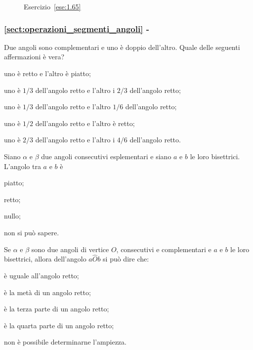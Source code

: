 \begin{figure}[htb]
 \centering
 \caption{Esercizio~\ref{ese:1.65}}\label{fig:ese1.65}
\end{figure}

\begingroup
\hypersetup{linkcolor=black}
\subsubsection*{\ref{sect:operazioni_segmenti_angoli} - }
\endgroup

\begin{esercizio}
\label{ese:1.66}
Due angoli sono complementari e uno è doppio dell'altro. Quale delle seguenti affermazioni è vera?
\begin{enumeratea}
\item uno è retto e l'altro è piatto;
\item uno è $1/3$ dell'angolo retto e l'altro i $2/3$ dell'angolo retto;
\item uno è $1/3$ dell'angolo retto e l'altro $1/6$ dell'angolo retto;
\item uno è $1/2$ dell'angolo retto e l'altro è retto;
\item uno è $2/3$ dell'angolo retto e l'altro i $4/6$ dell'angolo retto.
\end{enumeratea}
\end{esercizio}

\begin{esercizio}
\label{ese:1.67}
Siano $\alpha$ e $\beta$ due angoli consecutivi esplementari e siano $a$ e $b$ le loro bisettrici. L'angolo tra $a$ e $b$ è
\begin{multicols}{2}
\begin{enumeratea}
\item piatto;
\item retto;
\item nullo;
\item non si può sapere.
\end{enumeratea}
\end{multicols}
\end{esercizio}

\begin{esercizio}
\label{ese:1.68}
Se $\alpha$ e $\beta$ sono due angoli di vertice $O$, consecutivi e complementari e $a$ e $b$ le loro bisettrici, allora dell'angolo $a\widehat{O}b$ si può dire  che:
\begin{multicols}{2}
\begin{enumeratea}
\item è uguale all'angolo retto;
\item è la metà di un angolo retto;
\item è la terza parte di un angolo retto;
\item è la quarta parte di un angolo retto;
\item non è possibile determinarne l'ampiezza.
\end{enumeratea}
\end{multicols}
\end{esercizio}

